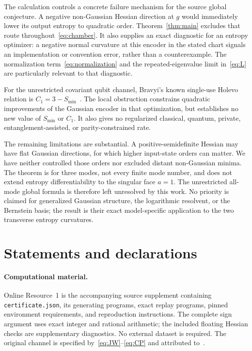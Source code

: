 \documentclass[11pt,a4paper]{article}
\begin{document}
The calculation controls a concrete failure mechanism for the source
global conjecture. A negative non-Gaussian Hessian direction at $g$
would immediately lower its output entropy to quadratic order.
Theorem~\ref{thm:main} excludes that route throughout~\eqref{eq:chamber}.
It also supplies an exact diagnostic for an entropy optimizer: a
negative normal curvature at this encoder in the stated chart
signals an implementation or convention error, rather than a
counterexample. The normalization term~\eqref{eq:normalization}
and the repeated-eigenvalue limit in~\eqref{eq:L} are particularly
relevant to that diagnostic.

For the unrestricted covariant qubit channel, Bravyi's known
single-use Holevo relation is $C_1=3-S_{\min}$~\cite{Bravyi2005}.
The local obstruction constrains quadratic improvements of the
Gaussian encoder in that optimization, but establishes no new value
of $S_{\min}$ or $C_1$. It also gives no regularized classical,
quantum, private, entanglement-assisted, or parity-constrained rate.

The remaining limitations are substantial. A positive-semidefinite
Hessian may have flat Gaussian directions, for which higher input-state
orders can matter. We have neither controlled those orders nor excluded
distant non-Gaussian minima. The theorem is for three modes, not every
finite mode number, and does not extend entropy differentiability to
the singular face $a=1$. The unrestricted all-mode global formula
is therefore left unresolved by this work. No priority is claimed
for generalized Gaussian structure, the logarithmic resolvent, or the
Bernstein basis; the result is their exact model-specific application
to the two transverse entropy curvatures.

\section*{Statements and declarations}
\paragraph{Computational material.}
Online Resource~1 is the accompanying source supplement containing
\texttt{certificate.json}, its generating programs, exact replay
programs, pinned environment requirements, and reproduction instructions.
The complete sign argument uses exact integer and rational arithmetic;
the included floating Hessian checks are supplementary diagnostics.
No external dataset is required. The original channel is specified
by~\eqref{eq:JW}--\eqref{eq:CP} and attributed to~\cite{Bravyi2005}.
\end{document}
